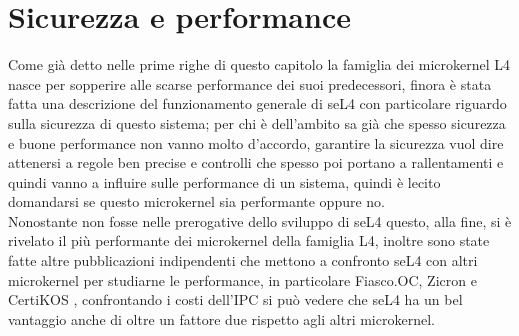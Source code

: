 \section{Sicurezza e performance}
Come già detto nelle prime righe di questo capitolo la famiglia dei microkernel L4 nasce per sopperire alle scarse performance dei suoi predecessori, finora è stata fatta una descrizione del funzionamento generale di seL4 con particolare riguardo sulla sicurezza di questo sistema; per chi è dell'ambito sa già che spesso sicurezza e buone performance non vanno molto d'accordo, garantire la sicurezza vuol dire attenersi a regole ben precise e controlli che spesso poi portano a rallentamenti e quindi vanno a influire sulle performance di un sistema, quindi è lecito domandarsi se questo microkernel sia performante oppure no.\\
Nonostante non fosse nelle prerogative dello sviluppo di seL4 questo, alla fine, si è rivelato il più performante dei microkernel della famiglia L4, inoltre sono state fatte altre pubblicazioni indipendenti che mettono a confronto seL4 con altri microkernel per studiarne le performance, in particolare Fiasco.OC, Zicron \cite{skybridge} e CertiKOS \cite{CertiKOS}, confrontando i costi dell'IPC si può vedere che seL4 ha un bel vantaggio anche di oltre un fattore due rispetto agli altri microkernel.
